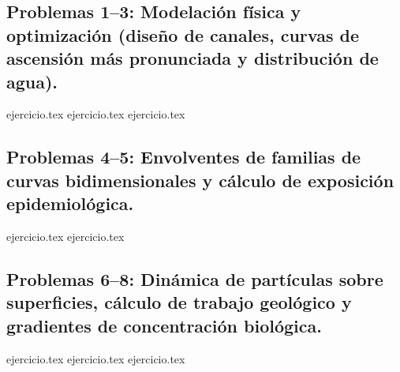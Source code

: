 
\subsection*{Problemas 1--3: Modelación física y optimización (diseño de canales, curvas de ascensión más pronunciada y distribución de agua).}
\begin{enumerate}
    {ejercicio.tex}
    {ejercicio.tex}
    {ejercicio.tex}
\end{enumerate}

\subsection*{Problemas 4--5: Envolventes de familias de curvas bidimensionales y cálculo de exposición epidemiológica.}
\begin{enumerate}
    \setcounter{enumi}{3}
    {ejercicio.tex}
    {ejercicio.tex}
\end{enumerate}

\subsection*{Problemas 6--8: Dinámica de partículas sobre superficies, cálculo de trabajo geológico y gradientes de concentración biológica.}
\begin{enumerate}
    \setcounter{enumi}{5}
    {ejercicio.tex}
    {ejercicio.tex}
    {ejercicio.tex}
\end{enumerate}

